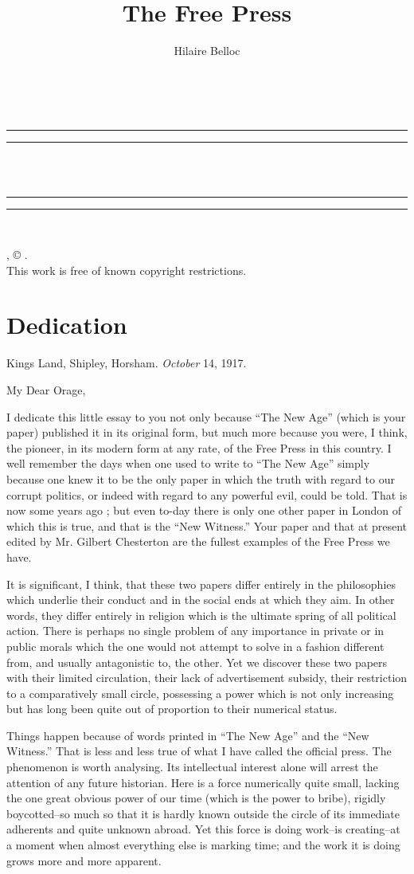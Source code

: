 \documentclass{book}
\date{}
\title{The Free Press}
\author{Hilaire Belloc}
\makeatletter
\renewcommand{\maketitle}{
  \thispagestyle{empty}
  \vspace*{\stretch{1}}
  
  \begin{center}
    {\Huge \@title   \\[5mm]}
  \end{center}
  \vspace*{\stretch{2}}
  
  \newpage
  \thispagestyle{empty}
  \cleardoublepage

  \begin{center}  
    \thispagestyle{empty}
    \vspace*{\baselineskip}
    \rule{\textwidth}{1.6pt}\vspace*{-\baselineskip}\vspace*{2pt}
    \rule{\textwidth}{0.4pt}\\[\baselineskip]
    
    {\Huge\scshape \@title   \\[5mm]}
    {\Large }
    
    \rule{\textwidth}{0.4pt}\vspace*{-\baselineskip}\vspace{3.2pt}
    \rule{\textwidth}{1.6pt}\\[\baselineskip]

    \vspace*{4\baselineskip}

    {\Large \@author}
    \vfill
    
  \end{center}
  
  \pagebreak
  \newpage
  \thispagestyle{empty}
  \null\vfill
  \noindent
  \begin{center}
    {\emph{\@title}, © \@author.\\[5mm]}
    {This work is free of known copyright restrictions.\\[5mm]}
  \end{center}
  \pagebreak
  \newpage
}
\makeatother
\begin{document}



\maketitle

\setcounter{tocdepth}{0}
\setcounter{secnumdepth}{0}
\tableofcontents
\chapter*{Dedication}
\label{chapter-0}
Kings Land, Shipley, Horsham. \emph{October} 14, 1917.

My Dear Orage,

I dedicate this little essay to you not only because “The New Age” (which is your paper) published it in its original form, but much more because you were, I think, the pioneer, in its modern form at any rate, of the Free Press in this country. I well remember the days when one used to write to “The New Age” simply because one knew it to be the only paper in which the truth with regard to our corrupt politics, or indeed with regard to any powerful evil, could be told. That is now some years ago ; but even to-day there is only one other paper in London of which this is true, and that is the “New Witness.” Your paper and that at present edited by Mr. Gilbert Chesterton are the fullest examples of the Free Press we have.

It is significant, I think, that these two papers differ entirely in the philosophies which underlie their conduct and in the social ends at which they aim. In other words, they differ entirely in religion which is the ultimate spring of all political action. There is perhaps no single problem of any importance in private or in public morals which the one would not attempt to solve in a fashion different from, and usually antagonistic to, the other. Yet we discover these two papers with their limited circulation, their lack of advertisement subsidy, their restriction to a comparatively small circle, possessing a power which is not only increasing but has long been quite out of proportion to their numerical status.

Things happen because of words printed in “The New Age” and the “New Witness.” That is less and less true of what I have called the official press. The phenomenon is worth analysing. Its intellectual interest alone will arrest the attention of any future historian. Here is a force numerically quite small, lacking the one great obvious power of our time (which is the power to bribe), rigidly boycotted–so much so that it is hardly known outside the circle of its immediate adherents and quite unknown abroad. Yet this force is doing work–is creating–at a moment when almost everything else is marking time; and the work it is doing grows more and more apparent.
\end{document}
